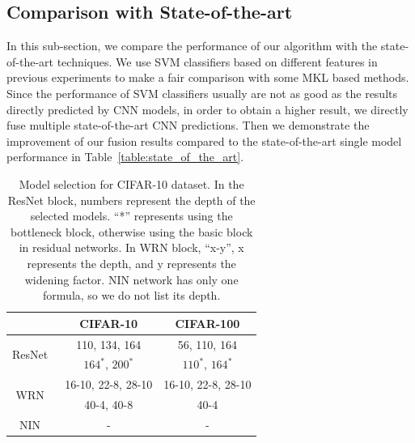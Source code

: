 \documentclass[10pt,twocolumn,letterpaper]{article}
\begin{document}
\subsection{Comparison with State-of-the-art}

In this sub-section, we compare the performance of our algorithm with the state-of-the-art techniques.
We use SVM classifiers based on different features in previous experiments to make a fair comparison with some MKL based methods.
Since the performance of SVM classifiers usually are not as good as the results directly predicted by CNN models,
in order to obtain a higher result, we directly fuse multiple state-of-the-art CNN predictions.
Then we demonstrate the improvement of our fusion results compared to the state-of-the-art single model performance in Table~\ref{table:state_of_the_art}.

\begin{table}[ht]
\begin{center}
\begin{tabular}{| c | c | c |}
    \hline
                                              & CIFAR-10             & CIFAR-100  \\\hline
\multirow{2}{*}{ResNet~\cite{he2016identity}} & 110, 134, 164        & 56, 110, 164  \\
                                              & $164^{*}$, $200^{*}$ & $110^{*}$, $164^{*}$  \\\hline
\multirow{2}{*}{WRN~\cite{zagoruyko2016wide}} & 16-10, 22-8, 28-10   & 16-10, 22-8, 28-10  \\
                                              &    40-4, 40-8        & 40-4  \\\hline
NIN~\cite{lin2013network}                     &     -                & -  \\ \hline
\end{tabular}
\end{center}
\caption{Model selection for CIFAR-10 dataset.
In the ResNet block, numbers represent the depth of the selected models.
``*'' represents using the bottleneck block, otherwise using the basic block in residual networks.
In WRN block, ``x-y'', x represents the depth, and y represents the widening factor.
NIN network has only one formula, so we do not list its depth.}
\label{table:models}
\end{table}
\end{document}

